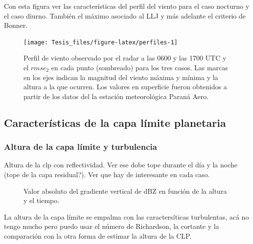 \documentclass[12pt,spanish,oneside]{book}
\begin{document}
Con esta figura ver las características del perfil del viento para el
caso nocturno y el caso diurno. También el máximo asociado al LLJ y más
adelante el criterio de Bonner.

\begin{figure}

{\centering \texttt{[image: Tesis\_files/figure-latex/perfiles-1]} 

}

\caption{Perfil de viento observado por el radar a las 0600 y las 1700 UTC y el $rmse_2$ en cada punto (sombreado) para los tres casos. Las marcas en los ejes indican la magnitud del viento máxima y mínima y la altura a la que ocurren. Los valores en superficie fueron obtenidos a partir de los datos del la estación meteorológica Paraná Aero. \label{perfiles-horarios}}\label{fig:perfiles}
\end{figure}

\subsection{Características de la capa límite
planetaria}\label{caracteristicas-de-la-capa-limite-planetaria}

\subsubsection{Altura de la capa límite y
turbulencia}\label{altura-de-la-capa-limite-y-turbulencia}

Altura de la clp con reflectividad. Ver ese dobe tope durante el día y
la noche (tope de la capa residual?). Ver que hay de interesante en cada
caso.

\begin{figure}

{\centering {}\newline{}\newline{}

}

\caption{Valor absoluto del gradiente vertical de dBZ en función de la altura y el tiempo. \label{pblh-dbz}}\label{fig:pblh-dbz}
\end{figure}

La altura de la capa límite se empalma con las caractersíticas
turbulentas, acá no tengo mucho pero puedo usar el número de Richardson,
la cortante y la comparación con la otra forma de estimar la altura de
la CLP.
\end{document}

